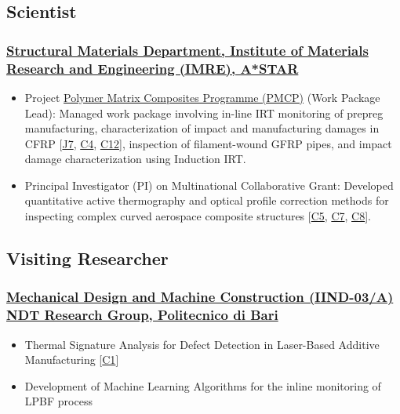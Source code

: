 \documentclass{my_cv}%
\begin{document}
\subsection{Scientist}
\subsubsection{\href{https://www.a-star.edu.sg/imre}{Structural Materials Department, Institute of Materials Research and Engineering (IMRE), A*STAR}}
\begin{itemize}[leftmargin=0.15in]
\setlength\itemsep{-0.1em}
\color{mygray}
\item Project \href{https://www.a-star.edu.sg/imre/news-and-highlights/highlights/media/polymer-matrix-composites-programme-(pmcp)}{Polymer Matrix Composites Programme (PMCP)} (Work Package Lead): Managed work package involving in-line IRT monitoring of prepreg manufacturing, characterization of impact and manufacturing damages in CFRP [\textcolor{mypink}{\hyperref[J7]{J7}}, \textcolor{mypink}{\hyperref[C4]{C4}}, \textcolor{mypink}{\hyperref[C12]{C12}}], inspection of filament-wound GFRP pipes, and impact damage characterization using Induction IRT.
\item Principal Investigator (PI) on Multinational Collaborative Grant: Developed quantitative active thermography and optical profile correction methods for inspecting complex curved aerospace composite structures [\textcolor{mypink}{\hyperref[C5]{C5}}, \textcolor{mypink}{\hyperref[C7]{C7}}, \textcolor{mypink}{\hyperref[C8]{C8}}].
\end{itemize}
{\color{mygray1} \hdashrule[0.1ex]{18.8cm}{0.2mm}{1mm}}
\subsection{Visiting Researcher}
\subsubsection{\href{https://www.dmmm.poliba.it/index.php/en/}{Mechanical Design and Machine Construction (IIND-03/A) NDT Research Group, Politecnico di Bari}}
\begin{itemize}[leftmargin=0.15in]
\setlength\itemsep{-0.1em}
\color{mygray}
\item Thermal Signature Analysis for Defect Detection in Laser-Based Additive Manufacturing [\textcolor{mypink}{\hyperref[C1]{C1}}]
\item Development of Machine Learning Algorithms for the inline monitoring of LPBF process
\end{itemize}
{\color{mygray1} \hdashrule[0.1ex]{18.8cm}{0.2mm}{1mm}}
\end{document}
